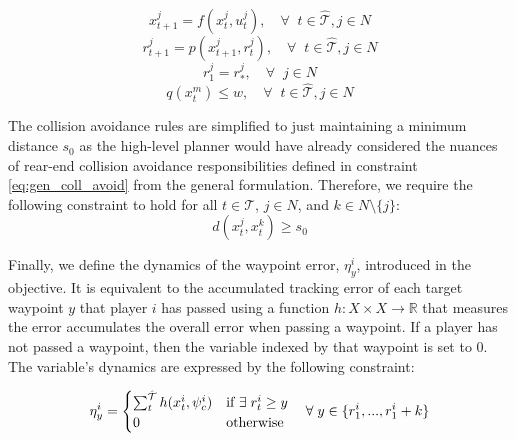\begin{equation} \label{eq:ll_dyn}
    x^j_{t+1} = f(x^j_{t}, u^j_t), \quad \forall \;\; t \in \hat{\mathcal{T}}, j \in N
\end{equation}
\begin{equation} \label{eq::ll_pos}
    r^j_{t+1} = p(x^j_{t+1}, r^j_t), \quad \forall \;\; t \in \hat{\mathcal{T}}, j \in N
\end{equation}
\begin{equation} \label{eq::ll_pos_init}
    r^j_{1} = r^j_*, \quad \forall\;\; j \in N
\end{equation}
\begin{equation} \label{eq:ll_pos_dist}
    q(x^m_{t}) \leq w, \quad \forall \;\; t \in \hat{\mathcal{T}}, j \in N
\end{equation}

The collision avoidance rules are simplified to just maintaining a minimum distance $s_0$ as the high-level planner would have already considered the nuances of rear-end collision avoidance responsibilities defined in constraint \eqref{eq:gen_coll_avoid} from the general formulation. Therefore, we require the following constraint to hold for all $t \in \mathcal{T}$, $j \in N$, and $k \in N \setminus \{j\}$:
\begin{equation} \label{eq:ll_coll_avoid}
    d(x^j_{t}, x^k_t) \geq s_0
\end{equation}

Finally, we define the dynamics of the waypoint error, $\eta^i_y$, introduced in the objective. It is equivalent to the accumulated tracking error of each target waypoint $y$ that player $i$ has passed using a function $h: X\times X \rightarrow \mathbb{R}$ that measures the error accumulates the overall error when passing a waypoint. If a player has not passed a waypoint, then the variable indexed by that waypoint is set to 0. The variable's dynamics are expressed by the following constraint:

\begin{equation} \label{eq:ll_wp_err}
    \eta^i_y = \begin{cases} \sum_{t}^{\Hat{\mathcal{T}}} h(x^i_t, \psi^i_{c})  & \text{if } \exists \; r^i_t \geq y \\
    0 & \text{otherwise}
    \end{cases} 
    \quad \forall \; y \in \{r^i_{1}, ..., r^i_{1} + k\}
\end{equation}

